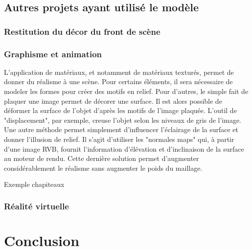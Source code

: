\section{Autres projets ayant utilisé le modèle}
\label{sect-autres}

\subsection{Restitution du décor du front de scène}

\subsection{Graphisme et animation}
L'application de matériaux, et notamment de matériaux texturés, permet de donner du réalisme à une scène. Pour certains éléments, il sera nécessaire de modeler les formes pour créer des motifs en relief. Pour d'autres, le simple fait de plaquer une image permet de décorer une surface. Il est alors possible de déformer la surface de l'objet d'après les motifs de l'image plaquée. L'outil de "displacement", par exemple, creuse l'objet selon les niveaux de gris de l'image. Une autre méthode permet simplement d'influencer l'éclairage de la surface et donner l'illusion de relief. Il s'agit d'utiliser les "normales maps" qui, à partir d'une image \gls{RVB}, fournit l'information d'élévation et d'inclinaison de la surface au moteur de rendu. Cette dernière solution permet d'augmenter considérablement le réalisme sans augmenter le poids du maillage.

Exemple chapiteaux

\subsection{Réalité virtuelle}
		
		
\chapter*{Conclusion}

